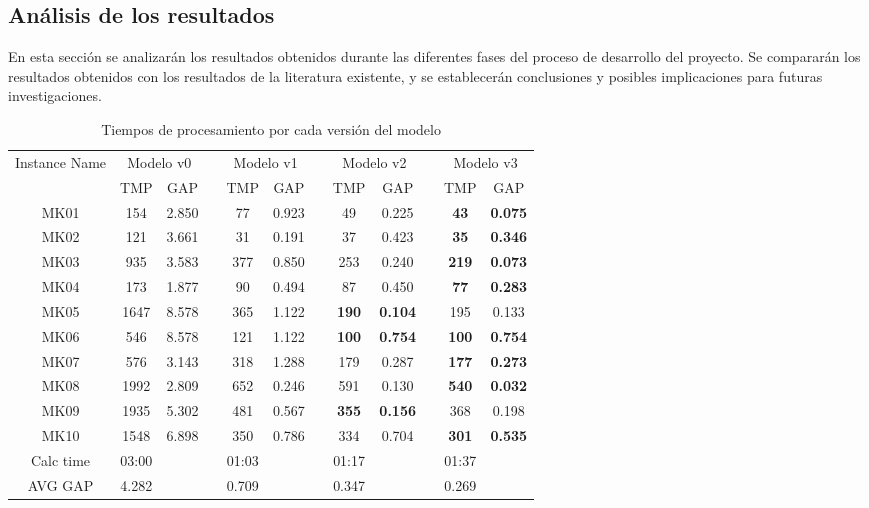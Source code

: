 \subsection{Análisis de los resultados}
En esta sección se analizarán los resultados obtenidos durante las diferentes
fases del proceso de desarrollo del proyecto. Se compararán los resultados
obtenidos con los resultados de la literatura existente, y se establecerán
conclusiones y posibles implicaciones para futuras investigaciones.

\begin{table}[ht]
    \caption{Tiempos de procesamiento por cada versión del modelo} 
    \centering 
    \begin{tabular}{cccccccccccc}  

    \toprule
    \multirow{2}{*}{\parbox[c]{.2\linewidth}{\centering Instance Name}} & 
    \multicolumn{2}{c}{Modelo v0} && 
    \multicolumn{2}{c}{Modelo v1} && 
    \multicolumn{2}{c}{Modelo v2} && 
    \multicolumn{2}{c}{Modelo v3} \\ 

    \cmidrule{2-3} \cmidrule{5-6} \cmidrule{8-9} \cmidrule{11-12}
     & {\centering TMP} & {GAP} && {TMP} & {GAP} && {TMP} & {GAP} && {TMP} & {GAP} \\

    \midrule
    MK01 & 154 & 2.850 && 77 & 0.923 && 49 & 0.225 && \textbf{43} & \textbf{0.075} \\
    MK02 & 121 & 3.661 && 31 & 0.191 && 37 & 0.423 && \textbf{35} & \textbf{0.346} \\
    MK03 & 935 & 3.583 && 377 & 0.850 && 253 & 0.240 && \textbf{219} & \textbf{0.073} \\  
    MK04 & 173 & 1.877 && 90 & 0.494 && 87 & 0.450 && \textbf{77} & \textbf{0.283} \\
    MK05 & 1647 & 8.578 && 365 & 1.122 && \textbf{190} & \textbf{0.104} && 195 & 0.133 \\
    MK06 & 546 & 8.578 && 121 & 1.122 && \textbf{100} & \textbf{0.754} && \textbf{100} & \textbf{0.754} \\
    MK07 & 576 & 3.143 && 318 & 1.288 && 179 & 0.287 && \textbf{177} & \textbf{0.273} \\
    MK08 & 1992 & 2.809 && 652 & 0.246 && 591 & 0.130 && \textbf{540} & \textbf{0.032} \\
    MK09 & 1935 & 5.302 && 481 & 0.567 && \textbf{355} & \textbf{0.156} && 368 & 0.198 \\
    MK10 & 1548 & 6.898 && 350 & 0.786 && 334 & 0.704 && \textbf{301} & \textbf{0.535} \\
    \hline
        Calc time    & 03:00    &&& 01:03    &&& 01:17    &&& 01:37    \\
        AVG GAP      & 4.282    &&& 0.709    &&& 0.347    &&& 0.269    \\
    \hline
    
    \end{tabular}
\end{table}

